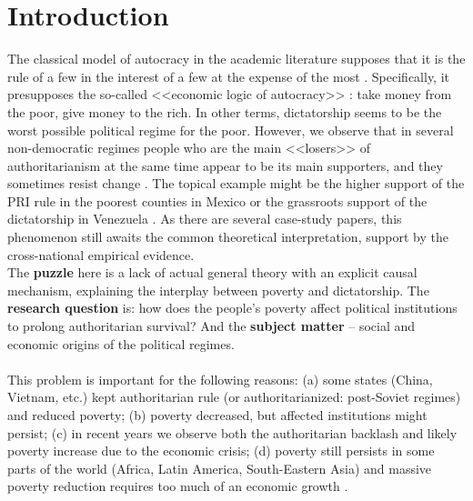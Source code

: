 \documentclass[a4paper, 12pt]{article}
\begin{document}
	\section{Introduction}
	
	The classical model of autocracy in the academic literature supposes that it is the rule of a few in the interest of a few at the expense of the most \parencite{political_roots, regime_development}. Specifically, it presupposes the so-called <<economic logic of autocracy>> \parencite{handbook}: take money from the poor, give money to the rich. In other terms, dictatorship seems to be the worst possible political regime for the poor. However, we observe that in several non-democratic regimes people who are the main <<losers>> of authoritarianism at the same time appear to be its main supporters, and they sometimes resist change \parencite{more_than_win, prizes}. The topical example might be the higher support of the PRI rule in the poorest counties in Mexico \parencite{voting_for_autocracy} or the grassroots support of the dictatorship in Venezuela \parencite{venezuela}. As there are several case-study papers, this phenomenon still awaits the common theoretical interpretation, support by the cross-national empirical evidence.
	\\
    
	
	\noindent The \textbf{puzzle} here is a lack of actual general theory with an explicit causal mechanism, explaining the interplay between poverty and dictatorship. The \textbf{research question} is: how does the people's poverty affect political institutions to prolong authoritarian survival? And the \textbf{subject matter} -- social and economic origins of the political regimes.
    \\\\
    This problem is important for the following reasons: (a)  some states (China, Vietnam, etc.) kept authoritarian rule (or authoritarianized: post-Soviet regimes) and reduced poverty; (b) poverty decreased, but affected institutions might persist; (c) in recent years we observe both the authoritarian backlash and likely poverty increase due to the economic crisis; (d) poverty still persists in some parts of the world (Africa, Latin America, South-Eastern Asia) and massive poverty reduction requires too much of an economic growth \parencite{povertyend}.
    \\
    
\end{document}
